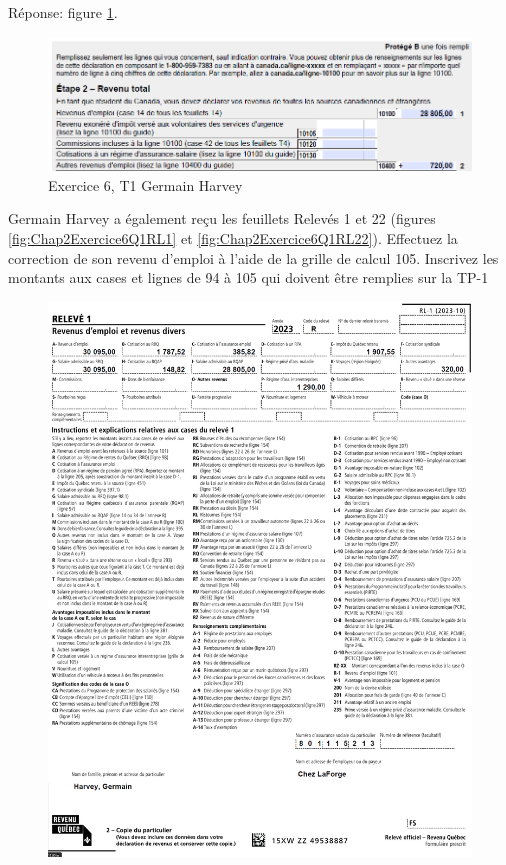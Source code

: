 Réponse: figure \ref{fig:Chap2Exercice6Q1aReponse}.
\begin{figure}
	\centering
	\includegraphics[width=.9\textwidth]{exercice/2-6/Q1/a-reponse.png}
	\caption{Exercice 6, T1 Germain Harvey}
	\label{fig:Chap2Exercice6Q1aReponse}
\end{figure}

\begin{sousQuestion}
	Germain Harvey a également reçu les feuillets Relevés 1 et 22 (figures \ref{fig:Chap2Exercice6Q1RL1} et \ref{fig:Chap2Exercice6Q1RL22}). Effectuez la correction de son revenu d'emploi à l'aide de la grille de calcul 105. Inscrivez les montants aux cases et lignes de 94 à 105 qui doivent être remplies sur la TP-1
		\begin{figure}
		\centering
		\includegraphics[width=.9\textwidth]{exercice/2-6/Q1/b-RL1.png}

\end{figure}
\end{sousQuestion}
